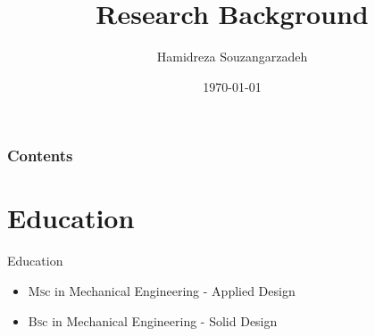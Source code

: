 \documentclass{beamer}
\title[Background Presentation]{Research Background} %
\author{Hamidreza Souzangarzadeh} %
\date{\today} %
\begin{document}
	
	\begin{frame}
		\titlepage %
	\end{frame}
	
	\begin{frame}
		\frametitle{Contents} %
		\tableofcontents %
	\end{frame}
	
	
	\section{Education} %
	
	\begin{frame} {Education}
		
		\begin{itemize}
			\item 	{{\textsc {Ms}}c in Mechanical Engineering - Applied Design}
			\item  {{\textsc {Bs}}c in Mechanical Engineering - Solid Design}
		\end{itemize}
		
		
	\end{frame}
	
\end{document}
